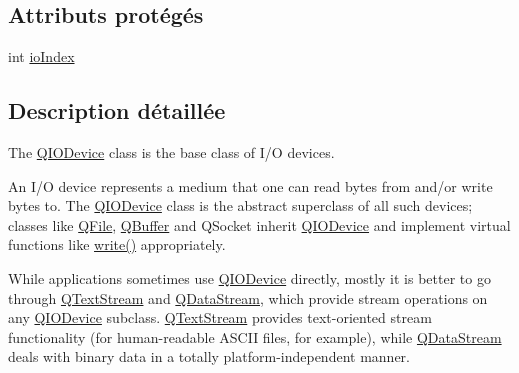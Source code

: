 \subsection*{Attributs protégés}
\begin{DoxyCompactItemize}
\item 
int \hyperlink{class_q_i_o_device_a577b65ea2ba37a2243de14143fa0878b}{io\+Index}
\end{DoxyCompactItemize}


\subsection{Description détaillée}
The \hyperlink{class_q_i_o_device}{Q\+I\+O\+Device} class is the base class of I/\+O devices. 

An I/\+O device represents a medium that one can read bytes from and/or write bytes to. The \hyperlink{class_q_i_o_device}{Q\+I\+O\+Device} class is the abstract superclass of all such devices; classes like \hyperlink{class_q_file}{Q\+File}, \hyperlink{class_q_buffer}{Q\+Buffer} and Q\+Socket inherit \hyperlink{class_q_i_o_device}{Q\+I\+O\+Device} and implement virtual functions like \hyperlink{structcmd_8h_af2a3ea719b83f672637febdd87c36c36}{write()} appropriately.

While applications sometimes use \hyperlink{class_q_i_o_device}{Q\+I\+O\+Device} directly, mostly it is better to go through \hyperlink{class_q_text_stream}{Q\+Text\+Stream} and \hyperlink{class_q_data_stream}{Q\+Data\+Stream}, which provide stream operations on any \hyperlink{class_q_i_o_device}{Q\+I\+O\+Device} subclass. \hyperlink{class_q_text_stream}{Q\+Text\+Stream} provides text-\/oriented stream functionality (for human-\/readable A\+S\+C\+I\+I files, for example), while \hyperlink{class_q_data_stream}{Q\+Data\+Stream} deals with binary data in a totally platform-\/independent manner.


